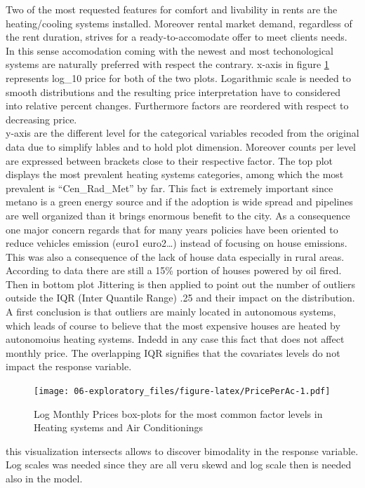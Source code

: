 \documentclass[
  12pt,
  a4paper,
  oneside]{book}
\theoremstyle{definition}
\theoremstyle{definition}
\theoremstyle{definition}
\theoremstyle{remark}
\begin{document}
Two of the most requested features for comfort and livability in rents are the heating/cooling systems installed. Moreover rental market demand, regardless of the rent duration, strives for a ready-to-accomodate offer to meet clients needs. In this sense accomodation coming with the newest and most techonological systems are naturally preferred with respect the contrary.
x-axis in figure \ref{fig:PricePerAc} represents log\_10 price for both of the two plots. Logarithmic scale is needed to smooth distributions and the resulting price interpretation have to considered into relative percent changes. Furthermore factors are reordered with respect to decreasing price.\\
y-axis are the different level for the categorical variables recoded from the original data due to simplify lables and to hold plot dimension. Moreover counts per level are expressed between brackets close to their respective factor.
The top plot displays the most prevalent heating systems categories, among which the most prevalent is ``Cen\_Rad\_Met'' by far. This fact is extremely important since metano is a green energy source and if the adoption is wide spread and pipelines are well organized than it brings enormous benefit to the city. As a consequence one major concern regards that for many years policies have been oriented to reduce vehicles emission (euro1 euro2\ldots) instead of focusing on house emissions. This was also a consequence of the lack of house data especially in rural areas. According to data there are still a 15\% portion of houses powered by oil fired.
Then in bottom plot Jittering is then applied to point out the number of outliers outside the IQR (Inter Quantile Range) .25 and their impact on the distribution. A first conclusion is that outliers are mainly located in autonomous systems, which leads of course to believe that the most expensive houses are heated by autonomoius heating systems. Indedd in any case this fact that does not affect monthly price. The overlapping IQR signifies that the covariates levels do not impact the response variable.

\begin{figure}
\centering
\texttt{[image: 06-exploratory\_files/figure-latex/PricePerAc-1.pdf]}
\caption{\label{fig:PricePerAc}Log Monthly Prices box-plots for the most common factor levels in Heating systems and Air Conditionings}
\end{figure}

this visualization intersects allows to discover bimodality in the response variable. Log scales was needed since they are all veru skewd and log scale then is needed also in the model.
\end{document}

